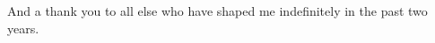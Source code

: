 And a thank you to all else who have shaped me indefinitely in the past two years.

 



  






 
\afterpage{\blankpage}


